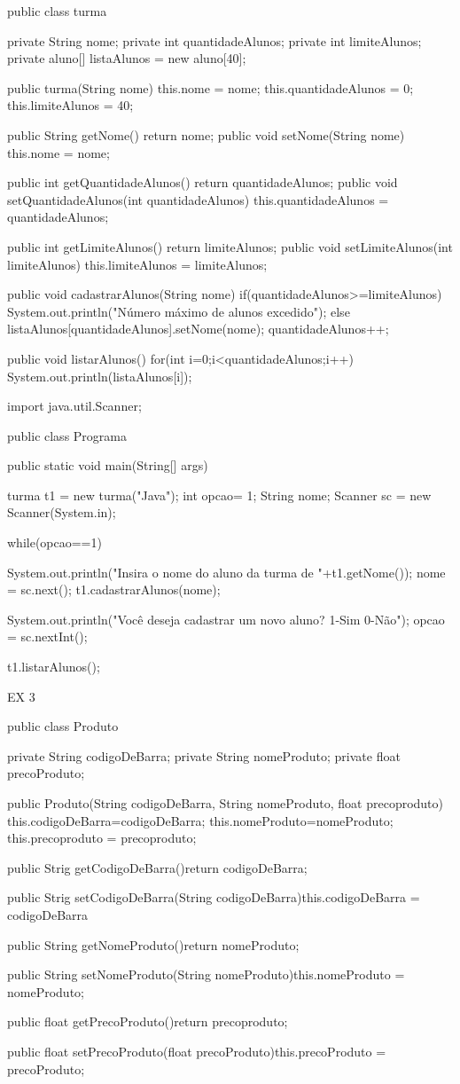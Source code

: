 public class turma{
	private String nome;
	private int quantidadeAlunos;
	private int limiteAlunos;
	private aluno[] listaAlunos = new aluno[40];

	public turma(String nome){
		this.nome = nome;
		this.quantidadeAlunos = 0;
		this.limiteAlunos = 40;
	}

	public String getNome() { return nome; }
	public void setNome(String nome) { this.nome = nome; }

	public int getQuantidadeAlunos() { return quantidadeAlunos; }
	public void setQuantidadeAlunos(int quantidadeAlunos) { this.quantidadeAlunos = quantidadeAlunos; }

	public int getLimiteAlunos() { return limiteAlunos; }
	public void setLimiteAlunos(int limiteAlunos) { this.limiteAlunos = limiteAlunos; }

	public void cadastrarAlunos(String nome){
			if(quantidadeAlunos>=limiteAlunos)
			{
				System.out.println("Número máximo de alunos excedido");
			}
			else
			{
				listaAlunos[quantidadeAlunos].setNome(nome);
				quantidadeAlunos++;
			}
	}

	public void listarAlunos(){
		for(int i=0;i<quantidadeAlunos;i++){
			System.out.println(listaAlunos[i]);
		}
	}
}

import java.util.Scanner;


public class Programa {

	public static void main(String[] args) {
		turma t1 = new turma("Java");
		int opcao= 1;
		String nome;
		Scanner sc = new Scanner(System.in);

		while(opcao==1){
			System.out.println("Insira o nome do aluno da turma de "+t1.getNome());
			nome = sc.next();
			t1.cadastrarAlunos(nome);

			System.out.println("Você deseja cadastrar um novo aluno? 1-Sim 0-Não");
			opcao = sc.nextInt();
		}

		t1.listarAlunos();
	}

}

EX 3

public class Produto{
	
	private String codigoDeBarra;
	private String nomeProduto;
	private float precoProduto;

	public Produto(String codigoDeBarra, String nomeProduto, float precoproduto){
		this.codigoDeBarra=codigoDeBarra;
		this.nomeProduto=nomeProduto;
		this.precoproduto = precoproduto;
	}

	public Strig getCodigoDeBarra(){return codigoDeBarra;}

	public Strig setCodigoDeBarra(String codigoDeBarra){this.codigoDeBarra = codigoDeBarra}

	public String getNomeProduto(){return nomeProduto;}

	public String setNomeProduto(String nomeProduto){this.nomeProduto = nomeProduto;}

	public float getPrecoProduto(){return precoproduto;}

	public float setPrecoProduto(float precoProduto){this.precoProduto = precoProduto;}
}

